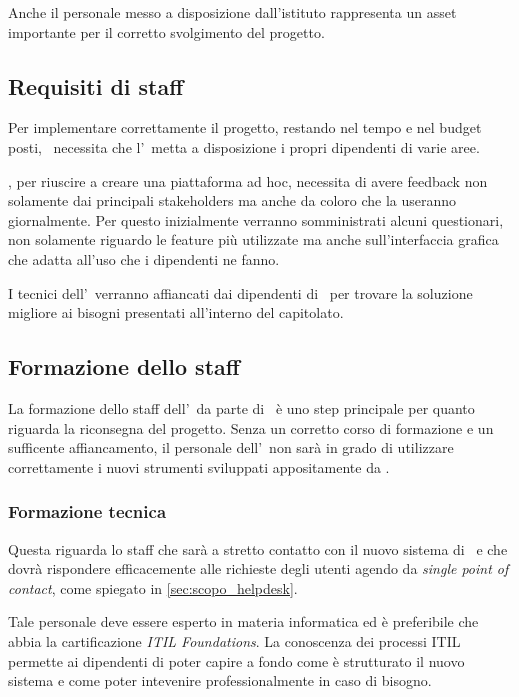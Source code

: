 	Anche il personale messo a disposizione dall'istituto rappresenta un asset importante per il corretto svolgimento del progetto.
	
	\subsection{Requisiti di staff}
	
		Per implementare correttamente il progetto, restando nel tempo e nel budget posti, \azienda~necessita che l'\istituto~metta a disposizione i propri dipendenti di varie aree.
		
		\azienda, per riuscire a creare una piattaforma ad hoc, necessita di avere feedback non solamente dai principali stakeholders ma anche da coloro che la useranno giornalmente.
		Per questo inizialmente verranno somministrati alcuni questionari, non solamente riguardo le feature più utilizzate ma anche sull'interfaccia grafica che adatta all'uso che i dipendenti ne fanno.
		
		I tecnici dell'\istituto~verranno affiancati dai dipendenti di \azienda~per trovare la soluzione migliore ai bisogni presentati all'interno del capitolato.
	
	\subsection{Formazione dello staff}
	
		La formazione dello staff dell'\istituto~da parte di \azienda~è uno step principale per quanto riguarda la riconsegna del progetto.
		Senza un corretto corso di formazione e un sufficente affiancamento, il personale dell'\istituto~non sarà in grado di utilizzare correttamente i nuovi strumenti sviluppati appositamente da \azienda.
	
		\subsubsection{Formazione tecnica}
			
			Questa riguarda lo staff che sarà a stretto contatto con il nuovo sistema di \helpdesk~e che dovrà rispondere efficacemente alle richieste degli utenti agendo da \textit{single point of contact}, come spiegato in \ref{sec:scopo_helpdesk}.
		
			Tale personale deve essere esperto in materia informatica ed è preferibile che abbia la cartificazione \textit{ITIL Foundations}.
			La conoscenza dei processi ITIL permette ai dipendenti di poter capire a fondo come è strutturato il nuovo sistema e come poter intevenire professionalmente in caso di bisogno.
			
